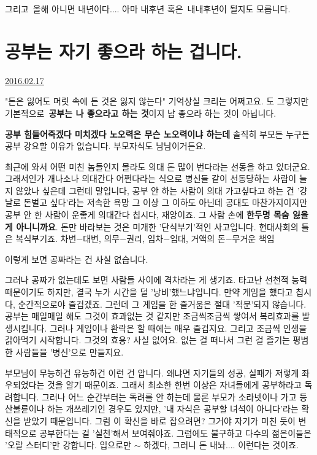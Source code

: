 그리고 올해 아니면 내년이다.... 아마 내후년 혹은 내내후년이 될지도 모릅니다.
\vspace{5mm}






\section{공부는 자기 좋으라 하는 겁니다.}
\href{https://www.kockoc.com/Apoc/639054}{2016.02.17}

\vspace{5mm}

"돈은 잃어도 머릿 속에 든 것은 잃지 않는다" 기억상실 크리는 어쩌고요.
도 그렇지만 기본적으로 \textbf{공부는 나 좋으라고 하는 것}이지 남 좋으라 하는 것이 아닙니다.
\vspace{5mm}

\textbf{공부 힘들어죽겠다 미치겠다 노오력은 무슨 노오력이냐 하는데}
솔직히 부모든 누구든 공부 강요할 이유가 없습니다. 부모자식도 남남이거든요.
\vspace{5mm}

최근에 와서 어떤 미친 놈들인지 몰라도 의대 돈 많이 번다라는 선동을 하고 있더군요.
그래서인가 개나소나 의대간다 어쩐다라는 식으로 병신들 같이 선동당하는 사람이 늘지 않았나 싶은데
그런데 말입니다, 공부 안 하는 사람이 의대 가고싶다고 하는 건 '걍 날로 돈벌고 싶다'라는 저속한 욕망 그 이상 그 이하도 아닌데
공대도 마찬가지이지만 공부 안 한 사람이 운좋게 의대간다 칩시다, 재앙이죠. 그 사람 손에 \textbf{한두명 목숨 잃을 게 아니니까요}.
돈만 바라보는 것은 미개한 '단식부기'적인 사고입니다.
현대사회의 틀은 복식부기죠. 차변$-$대변, 의무$-$권리, 임차$-$임대, 거액의 돈$-$무거운 책임
\vspace{5mm}

이렇게 보면 공짜라는 건 사실 없습니다.
\vspace{5mm}

그러나 공짜가 없는데도 보면 사람들 사이에 격차라는 게 생기죠.
타고난 선천적 능력 때문이기도 하지만, 결국 누가 시간을 덜 '낭비'했느냐입니다.
만약 게임을 했다고 칩시다, 순간적으로야 즐겁겠죠. 그런데 그 게임을 한 즐거움은 절대 '적분'되지 않습니다.
공부는 매일매일 해도 그것이 효과없는 것 같지만 조금씩조금씩 쌓여서 복리효과를 발생시킵니다.
그러나 게임이나 환락은 할 때에는 매우 즐겁지요. 그리고 조금씩 인생을 갉아먹기 시작합니다. 그것의 효용? 사실 없어요.
없는 걸 떠나서 그런 걸 즐기는 평범한 사람들을 '병신'으로 만들지요.
\vspace{5mm}

부모님이 무능하건 유능하건 이런 건 압니다. 왜냐면 자기들의 성공, 실패가 저렇게 좌우되었다는 것을 알기 때문이죠.
그래서 최소한 한번 이상은 자녀들에게 공부하라고 독려합니다.
그러나 어느 순간부터는 독려를 안 하는데 물론 부모가 소라넷이나 가고 등산불륜이나 하는 개쓰레기인 경우도 있지만,
'내 자식은 공부할 녀석이 아니다'라는 확신을 받았기 때문입니다.
그럼 이 확신을 바로 잡으려면? 그거야 자기가 미친 듯이 변태적으로 공부한다는 걸 '실천'해서 보여줘야죠.
그럼에도 불구하고 다수의 젊은이들은 '오랄 스터디'만 강합니다. 입으로만 $\sim$ 하겠다, 그러니 돈 내놔.... 이런다는 것이죠.
\vspace{5mm}


